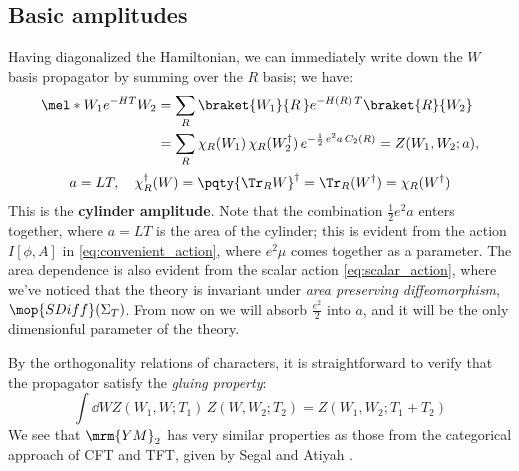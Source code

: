 \documentclass[a4paper
	,10pt
]{article}
\newcommand{\YM}{{\ensuremath{\mrm{YM}_2}}\xspace}
\begin{document}
\subsection{Basic amplitudes}
	Having diagonalized the Hamiltonian, we can immediately write down the $W$ basis propagator by summing over the $R$ basis; we have:
	\begin{gather}
	\begin{aligned}
		\mel*{W_1}{e^{-HT}}{W_2}
		&= \sum_R
			\braket{W_1}{R\,}
			e^{-H(R)\,T}
			\braket{R}{W_2} \\
		&= \sum_R
			\chi_R(W_1)\,
			\chi_R(W_2^\dagger)\,
			e^{-\frac{1}{2}\,e^2 a\,C_2(R)}
		= Z(W_1,W_2;a),
	\end{aligned}
	\\[.3ex]
		a = LT,
	\quad
		\chi_R^\dagger(W)
		= \pqty{\Tr_R W}^\dagger
		= \Tr_R (W^\dagger)
		= \chi_R(W^\dagger)
	\end{gather}
	This is the \textbf{cylinder amplitude}. 
	Note that the combination $\frac{1}{2} e^2 a$ enters together, where $a = LT$ is the area of the cylinder; this is evident from the action $I[\phi,A]$ in \eqref{eq:convenient_action}, where $e^2 \mu$ comes together as a parameter. The area dependence is also evident from the scalar action \eqref{eq:scalar_action}, where we've noticed that the theory is invariant under \textit{area preserving diffeomorphism}, $\mop{SDiff}(\Sigma_T)$. From now on we will absorb $\frac{e^2}{2}$ into $a$, and it will be the only dimensionful parameter of the theory.
	
	By the orthogonality relations of characters, it is straightforward to verify that the propagator satisfy the \textit{gluing property}:
	\begin{equation}
		\int \dd{W}
			Z(W_1,W;T_1)\,Z(W,W_2;T_2)
		= Z(W_1,W_2;T_1 + T_2)
	\end{equation}
	We see that \YM has very similar properties as those from the categorical approach of CFT and TFT, given by Segal and Atiyah \cite{Segal1988,Atiyah1988}. 
	
\end{document}

